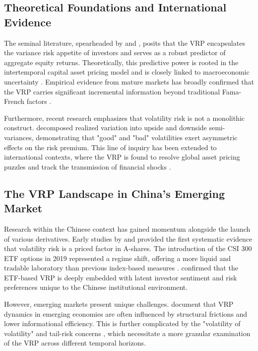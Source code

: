 \documentclass[a4paper, 12pt]{article}    %
\begin{document}
\subsection{Theoretical Foundations and International Evidence}
The seminal literature, spearheaded by {\cite{bollerslev2009}} and {\cite{carr2009variance}}, posits that the VRP encapsulates the variance risk appetite of investors and serves as a robust predictor of aggregate equity returns. Theoretically, this predictive power is rooted in the intertemporal capital asset pricing model {\citep{merton1973}} and is closely linked to macroeconomic uncertainty {\citep{drechsler2011, zhou2018variance}}. Empirical evidence from mature markets has broadly confirmed that the VRP carries significant incremental information beyond traditional Fama-French factors {\citep{bollerslev2014stock}}.

Furthermore, recent research emphasizes that volatility risk is not a monolithic construct. {\cite{bollerslev2014}} decomposed realized variation into upside and downside semi-variances, demonstrating that "good" and "bad" volatilities exert asymmetric effects on the risk premium. This line of inquiry has been extended to international contexts, where the VRP is found to resolve global asset pricing puzzles and track the transmission of financial shocks {\citep{londono2017variance, rapach2013}}.

\subsection{The VRP Landscape in China’s Emerging Market}
Research within the Chinese context has gained momentum alongside the launch of various derivatives. Early studies by {\cite{chen2009volatility}} and {\cite{zheng2013volatility}} provided the first systematic evidence that volatility risk is a priced factor in A-shares. The introduction of the CSI 300 ETF options in 2019 represented a regime shift, offering a more liquid and tradable laboratory than previous index-based measures {\citep{huang2016modelfree}}. {\cite{chen2021volatility}} confirmed that the ETF-based VRP is deeply embedded with latent investor sentiment and risk preferences unique to the Chinese institutional environment.

However, emerging markets present unique challenges. {\cite{qiao2024variance}} document that VRP dynamics in emerging economies are often influenced by structural frictions and lower informational efficiency. This is further complicated by the "volatility of volatility" and tail-risk concerns {\citep{chen2018tail, dai2020efficient}}, which necessitate a more granular examination of the VRP across different temporal horizons.
\end{document}
